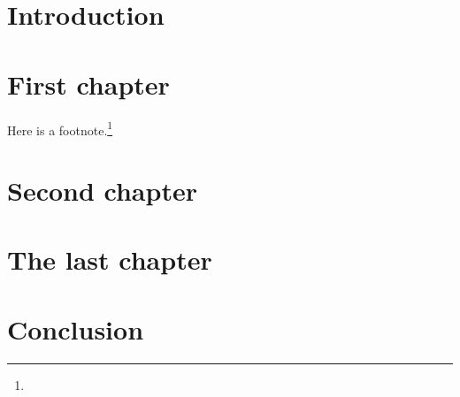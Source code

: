 \documentclass{pleanote} 	%
\begin{document}
\begin{spacing}{0.96}
\chapter{Introduction}
\setcounter{page}{1}

\kant[1-5]


\chapter{First chapter}
Here is a footnote.\footnote{\kant[9]}
\kant[7-23]

\chapter{Second chapter}
\kant[24-28]

\chapter{The last chapter}
\kant[29-33]

\chapter{Conclusion}
\kant[34-36]



\newpage
\thispagestyle{empty}
\null
\end{spacing}
\end{document}
